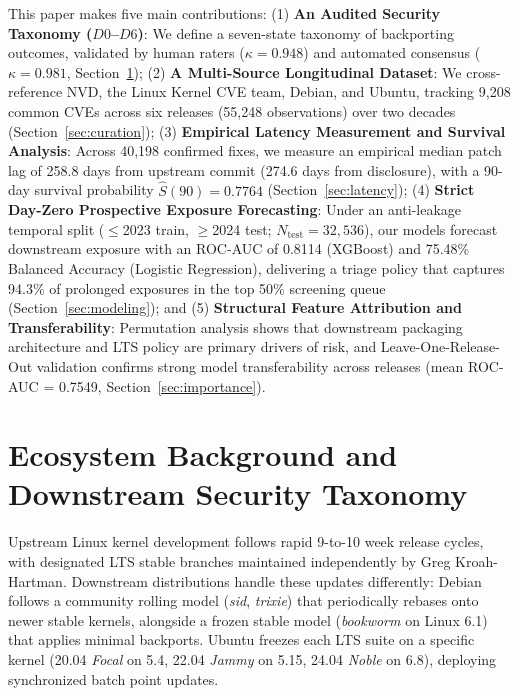 \documentclass[graybox]{svmult}
\begin{document}
This paper makes five main contributions:
(1) \textbf{An Audited Security Taxonomy ($D0$--$D6$)}: We define a seven-state taxonomy of backporting outcomes, validated by human raters ($\kappa = 0.948$) and automated consensus ($\kappa = 0.981$, Section~\ref{sec:background});
(2) \textbf{A Multi-Source Longitudinal Dataset}: We cross-reference NVD, the Linux Kernel CVE team, Debian, and Ubuntu, tracking 9,208 common CVEs across six releases (55,248 observations) over two decades (Section~\ref{sec:curation});
(3) \textbf{Empirical Latency Measurement and Survival Analysis}: Across 40,198 confirmed fixes, we measure an empirical median patch lag of 258.8 days from upstream commit (274.6 days from disclosure), with a 90-day survival probability $\hat{S}(90) = 0.7764$ (Section~\ref{sec:latency});
(4) \textbf{Strict Day-Zero Prospective Exposure Forecasting}: Under an anti-leakage temporal split ($\le$2023 train, $\ge$2024 test; $N_{\text{test}} = 32,536$), our models forecast downstream exposure with an ROC-AUC of 0.8114 (XGBoost) and 75.48\% Balanced Accuracy (Logistic Regression), delivering a triage policy that captures 94.3\% of prolonged exposures in the top 50\% screening queue (Section~\ref{sec:modeling}); and
(5) \textbf{Structural Feature Attribution and Transferability}: Permutation analysis shows that downstream packaging architecture and LTS policy are primary drivers of risk, and Leave-One-Release-Out validation confirms strong model transferability across releases (mean ROC-AUC = 0.7549, Section~\ref{sec:importance}).

\section{Ecosystem Background and Downstream Security Taxonomy}
\label{sec:background}

Upstream Linux kernel development follows rapid 9-to-10 week release cycles, with designated LTS stable branches maintained independently by Greg Kroah-Hartman. Downstream distributions handle these updates differently: Debian follows a community rolling model (\textit{sid}, \textit{trixie}) that periodically rebases onto newer stable kernels, alongside a frozen stable model (\textit{bookworm} on Linux 6.1) that applies minimal backports. Ubuntu freezes each LTS suite on a specific kernel (20.04 \textit{Focal} on 5.4, 22.04 \textit{Jammy} on 5.15, 24.04 \textit{Noble} on 6.8), deploying synchronized batch point updates.
\end{document}
